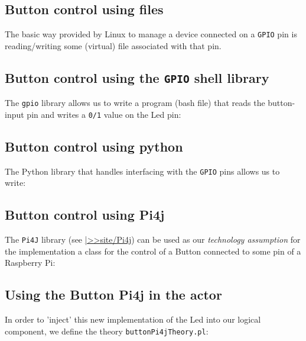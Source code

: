 \subsection{Button control using files}
The basic way provided by Linux to manage a device connected on a \texttt{GPIO} pin is reading/writing some (virtual) file associated with that pin.





\subsection{Button control using the \texttt{GPIO} shell library}
The \texttt{gpio} library allows us to write a program (bash file) that reads the button-input pin and writes a \texttt{0/1} value on the Led pin:



\subsection{Button control using python}
The Python library that handles interfacing with the \texttt{GPIO} pins allows us to write:





\subsection{Button control using Pi4j}
The \texttt{Pi4J} library (see \href{https://137.204.107.21/syskb/it.unibo.iss2015intro/docs/Raspberry/pi4j.html}{|>>site/Pi4j}) can be used as our \textit{technology assumption} for the implementation a \java{} class for the control of a Button connected to some pin of a Raspberry Pi:



\subsection{Using the Button Pi4j in the actor}
In order to 'inject' this new implementation of the Led into our logical component, we define the theory \texttt{buttonPi4jTheory.pl}:

